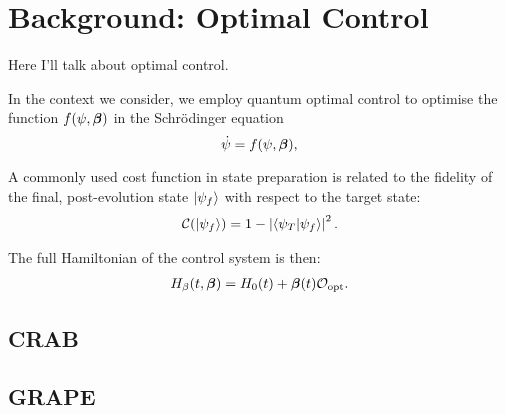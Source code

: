 \chapter{Background: Optimal Control}

Here I'll talk about optimal control.

In the context we consider,  we employ quantum optimal control to optimise the function $f(\psi,\boldsymbol{\beta})$ in the Schr\"odinger equation
\begin{equation}
\dot{\psi} = f(\psi,\boldsymbol{\beta}),
\label{eq:control_schroedinger}
\end{equation}

A commonly used cost function in state preparation is related  to the fidelity of the final, post-evolution state $\ket{\psi_f}$ with respect to the target state:
\begin{align} \label{eq:lossfunc}
    \mathcal{C}(\ket{\psi_f}) = 1 - \left|\braket{\psi_T}{\psi_f}\right|^2.
\end{align}

The full Hamiltonian of the control system is then:
\begin{align} \label{eq:h_optimal_control}
    H_{\beta}(t,\boldsymbol{\beta})  = H_0(t) + \boldsymbol{\beta}(t)\mathcal{O}_{\rm opt}.
\end{align}

    \section{CRAB}
    \section{GRAPE}